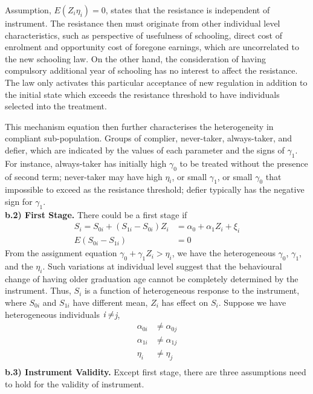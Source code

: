\documentclass[a4paper,12pt,oneside,English]{article}
\begin{document}
Assumption, \( E(Z_i \eta _i) = 0\), states that the resistance is independent of instrument. The resistance then must originate from other individual level characteristics, such as perspective of usefulness of schooling, direct cost of enrolment and opportunity cost of foregone earnings, which are uncorrelated to the new schooling law. On the other hand, the consideration of having compulsory additional year of schooling has no interest to affect the resistance. The law only activates this particular acceptance of new regulation in addition to the initial state which exceeds the resistance threshold to have individuals selected into the treatment. 

This mechanism equation then further characterises the heterogeneity in compliant sub-population.  Groups of complier, never-taker, always-taker, and defier, which are indicated by the values of each parameter and the signs of $\gamma_1$. For instance, always-taker has initially high $\gamma_0$ to be treated without the presence of second term; never-taker may have high $\eta_i$, or small $\gamma_1$, or small $\gamma_0$ that impossible to exceed as the resistance threshold; defier typically has the negative sign for $\gamma_1$.\\

\textbf{b.2) First Stage.} 
There could be a first stage if 
\begin{align}
  S_i =S_{0i}+(S_{1i}-S_{0i})Z_i &=\alpha_0 + \alpha_1 Z_i + \xi_i \\
E(S_{0i}-S_{1i}) &= 0  
\end{align}
From the assignment equation \(\gamma_0+ \gamma_1 Z_i > \eta_i\), we have the heterogeneous $\gamma_0$, $\gamma_1$, and the $\eta_i$. Such variations at individual level suggest that the behavioural change of having older graduation age cannot be completely determined by the instrument. Thus, ${S_i}$ is a function of heterogeneous response to the instrument, where $S_{0i}$ and $S_{1i}$ have different mean, $Z_i$ has effect on $S_i$. Suppose we have heterogeneous individuals $\emph{i} \not= $\emph{j},
\begin{align*}
  \alpha_{0i} & \not= \alpha_{0j} \\
  \alpha_{1i} & \not= \alpha_{1j} \\
  \eta_i & \not= \eta_j \\
\end{align*}
\textbf{b.3) Instrument Validity.}
Except first stage, there are three assumptions need to hold for the validity of instrument.
\end{document}

